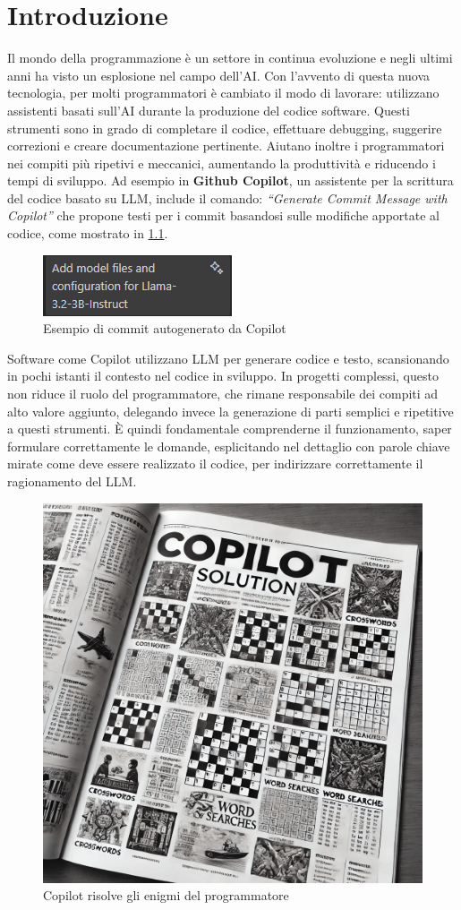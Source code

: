 \documentclass[12pt,a4paper,openright,twoside]{book}
\begin{document}
\chapter{Introduzione}
\label{chap:introduction}
Il mondo della programmazione è un settore in continua evoluzione e negli ultimi anni ha visto un esplosione nel campo dell'\ac{AI}.
Con l'avvento di questa nuova tecnologia, per molti programmatori è cambiato il modo di lavorare: utilizzano  assistenti basati sull’AI durante la produzione del codice software.
Questi strumenti sono in grado di completare il codice, effettuare debugging, suggerire correzioni e creare documentazione pertinente.
Aiutano inoltre i programmatori nei compiti più ripetivi e meccanici, aumentando la produttività e riducendo i tempi di sviluppo.
Ad esempio in \textbf{Github Copilot},  un assistente per la scrittura del codice basato su \ac{LLM}, include il comando: \emph{``Generate Commit Message with Copilot''}
che propone testi per i commit basandosi sulle modifiche apportate al codice, come mostrato in \cref{figura:Commit-Autogenerato}.
\begin{figure}[h]
    \centering
    \includegraphics[width=0.5\linewidth]{figures/commit.png}
    \caption{Esempio di commit autogenerato da Copilot}
    \label{figura:Commit-Autogenerato}
\end{figure}
Software come Copilot utilizzano LLM per generare codice e testo, scansionando in pochi istanti il contesto nel codice in sviluppo.
In progetti complessi, questo non riduce il ruolo del programmatore, che rimane responsabile dei compiti ad alto valore aggiunto, delegando invece la generazione di parti semplici e ripetitive a questi strumenti.
\`E quindi fondamentale comprenderne il funzionamento, saper formulare correttamente le domande, esplicitando nel dettaglio con parole chiave mirate come deve essere realizzato il codice, per indirizzare correttamente il ragionamento del \ac{LLM}.
\begin{figure}[h]
    \centering
    \includegraphics[width=0.5\linewidth]{figures/copilotsolutionSettimanaEnigmistica.png}
    \caption{Copilot risolve gli enigmi del programmatore}
    \label{fig:Copilot-Solution}
\end{figure}
\end{document}
